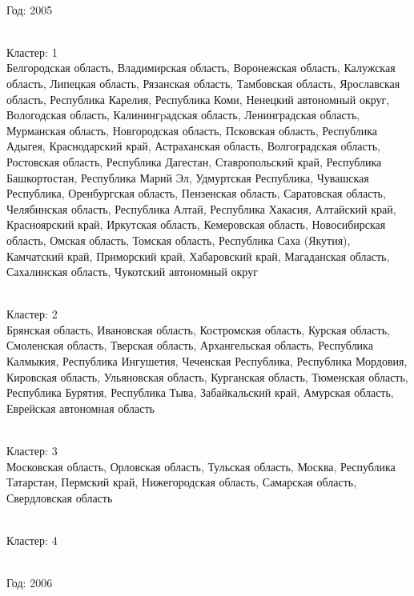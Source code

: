\documentclass[11pt]{article}
\begin{document}
\newline \newline \\ Год:  2005

\newline \\ Кластер:  1
\\ Белгородская область, Владимирская область, Воронежская область, Калужская область, Липецкая область, Рязанская область, Тамбовская область, Ярославская область, Республика Карелия, Республика Коми, Ненецкий автономный округ, Вологодская область, Калинингpадская область, Ленинградская область, Мурманская область, Новгородская область, Псковская область, Республика Адыгея, Краснодарский край, Астраханская область, Волгоградская область, Ростовская область, Республика Дагестан, Ставропольский край, Республика Башкортостан, Республика Марий Эл, Удмуртская Республика, Чувашская Республика, Оренбургская область, Пензенская область, Саратовская область, Челябинская область, Республика Алтай, Республика Хакасия, Алтайский край, Красноярский край, Иркутская область, Кемеровская область, Новосибирская область, Омская область, Томская область, Республика Саха (Якутия), Камчатский край, Приморский край, Хабаровский край, Магаданская область, Сахалинская область, Чукотский автономный округ

\newline \\ Кластер:  2
\\ Брянская область, Ивановская область, Костромская область, Курская область, Смоленская область, Тверская область, Архангельская область, Республика Калмыкия, Республика Ингушетия, Чеченская Республика, Республика Мордовия, Кировская область, Ульяновская область, Курганская область, Тюменская область, Республика Бурятия, Республика Тыва, Забайкальский край, Амурская область, Еврейская автономная область

\newline \\ Кластер:  3
\\ Московская область, Орловская область, Тульская область, Москва, Республика Татарстан, Пермский край, Нижегородская область, Самарская область, Свердловская область

\newline \\ Кластер:  4



\newline \newline \\ Год:  2006
\end{document}
